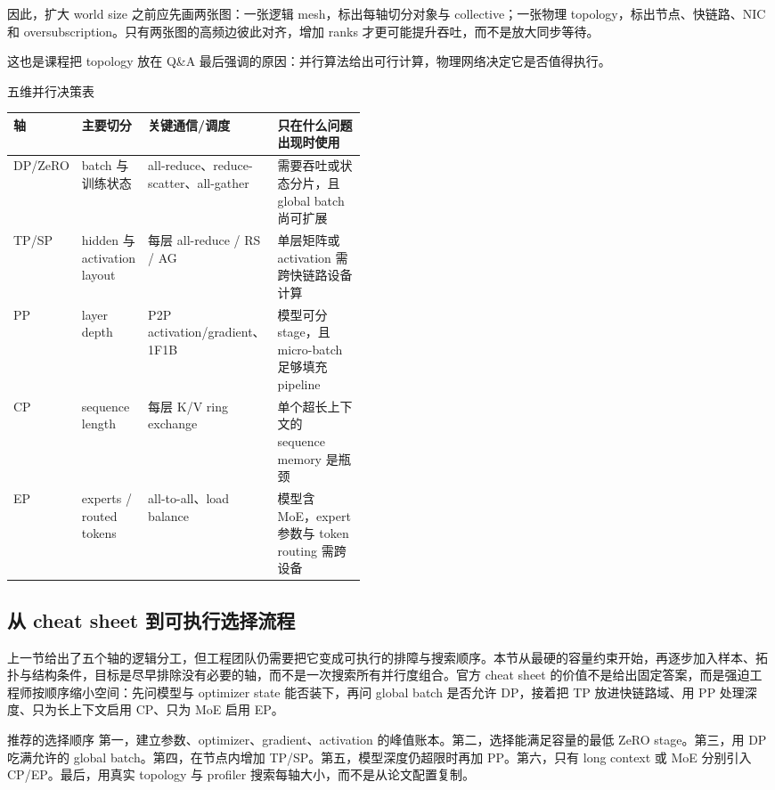 因此，扩大 world size 之前应先画两张图：一张逻辑 mesh，标出每轴切分对象与 collective；一张物理 topology，标出节点、快链路、NIC 和 oversubscription。只有两张图的高频边彼此对齐，增加 ranks 才更可能提升吞吐，而不是放大同步等待。

这也是课程把 topology 放在 Q\&A 最后强调的原因：并行算法给出可行计算，物理网络决定它是否值得执行。

\begin{knowledgebox}{五维并行决策表}
\begin{tabularx}{\linewidth}{L{0.12\linewidth} L{0.16\linewidth} L{0.18\linewidth} X}
\toprule
轴 & 主要切分 & 关键通信/调度 & 只在什么问题出现时使用 \\
\midrule
DP/ZeRO & batch 与训练状态 & all-reduce、reduce-scatter、all-gather & 需要吞吐或状态分片，且 global batch 尚可扩展 \\
TP/SP & hidden 与 activation layout & 每层 all-reduce / RS / AG & 单层矩阵或 activation 需跨快链路设备计算 \\
PP & layer depth & P2P activation/gradient、1F1B & 模型可分 stage，且 micro-batch 足够填充 pipeline \\
CP & sequence length & 每层 K/V ring exchange & 单个超长上下文的 sequence memory 是瓶颈 \\
EP & experts / routed tokens & all-to-all、load balance & 模型含 MoE，expert 参数与 token routing 需跨设备 \\
\bottomrule
\end{tabularx}
\end{knowledgebox}

\subsection{从 cheat sheet 到可执行选择流程}

上一节给出了五个轴的逻辑分工，但工程团队仍需要把它变成可执行的排障与搜索顺序。本节从最硬的容量约束开始，再逐步加入样本、拓扑与结构条件，目标是尽早排除没有必要的轴，而不是一次搜索所有并行度组合。官方 cheat sheet 的价值不是给出固定答案，而是强迫工程师按顺序缩小空间：先问模型与 optimizer state 能否装下，再问 global batch 是否允许 DP，接着把 TP 放进快链路域、用 PP 处理深度、只为长上下文启用 CP、只为 MoE 启用 EP。


\begin{importantbox}{推荐的选择顺序}
第一，建立参数、optimizer、gradient、activation 的峰值账本。第二，选择能满足容量的最低 ZeRO stage。第三，用 DP 吃满允许的 global batch。第四，在节点内增加 TP/SP。第五，模型深度仍超限时再加 PP。第六，只有 long context 或 MoE 分别引入 CP/EP。最后，用真实 topology 与 profiler 搜索每轴大小，而不是从论文配置复制。
\end{importantbox}

